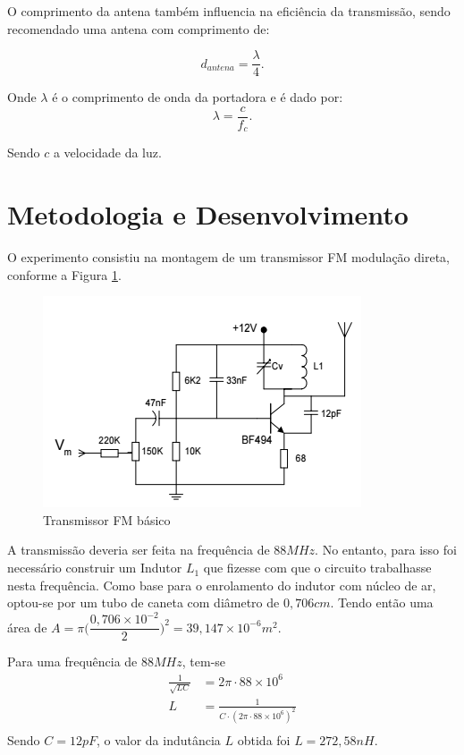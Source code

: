 \documentclass[12pt,a4paper]{article}%
\begin{document}
O comprimento da antena também influencia na eficiência da transmissão, sendo recomendado uma antena com comprimento de:

\[
    d_{antena} = \frac{\lambda}{4}.
\]

Onde $\lambda$ é o comprimento de onda da portadora e é dado por:
\[
    \lambda = \frac{c}{f_c}.
\]
\newpage

Sendo $c$ a velocidade da luz.

\section{Metodologia e Desenvolvimento}
O experimento consistiu na montagem de um transmissor FM  modulação direta, conforme a Figura \ref{fig:transmissor}.
\begin{figure}[H]
\centering
\includegraphics{imagem/transmissor.png}
\caption{Transmissor FM básico}
\label{fig:transmissor}
\end{figure}

A transmissão deveria ser feita na frequência de $88MHz$. No entanto, para isso foi necessário construir um Indutor $L_1$ que fizesse com que o circuito trabalhasse nesta frequência.
Como base para o enrolamento do indutor com núcleo de ar, optou-se por um tubo de caneta com diâmetro de $0,706cm$.
Tendo então uma área de $A=\pi \Bigg(\dfrac{0,706\times10^{-2}}{2}\Bigg)^2=39,147\times10^{-6}m^2$.

Para uma frequência de $88MHz$, tem-se
\begin{equation}
\begin{split}
\frac{1}{\sqrt{LC}}&=2\pi\cdot88\times10^6 \\L&=\frac{1}{C\cdot (2\pi\cdot88\times10^6)^2}\\
\end{split}
\end{equation}
Sendo $C=12pF$, o valor da indutância $L$ obtida foi $L=272,58nH$.
\end{document}
